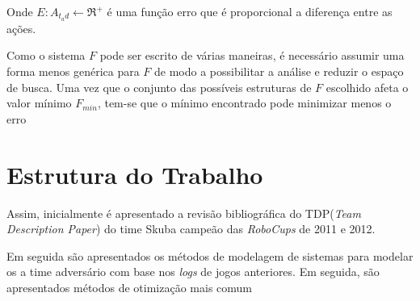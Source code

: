 Onde $E: A_{t_ad} \leftarrow \Re^+$ é uma função erro que é proporcional a diferença entre as ações.

Como o sistema $F$ pode ser escrito de várias maneiras, é necessário assumir uma forma menos genérica
para $F$ de modo a possibilitar a análise e reduzir o espaço de busca. Uma vez que o conjunto das possíveis estruturas de $F$
escolhido afeta o valor mínimo $F_{min}$, tem-se que o mínimo encontrado pode minimizar menos o erro

\section{Estrutura do Trabalho}

\par Assim, inicialmente é apresentado a revisão bibliográfica do TDP(\textit{Team Description Paper}) do time Skuba
campeão das \textit{RoboCups} de 2011 e 2012. 
\par Em seguida são apresentados os métodos de modelagem de sistemas para modelar os
a time adversário com base nos \textit{logs} de jogos anteriores. Em seguida, são apresentados
métodos de otimização mais comum

